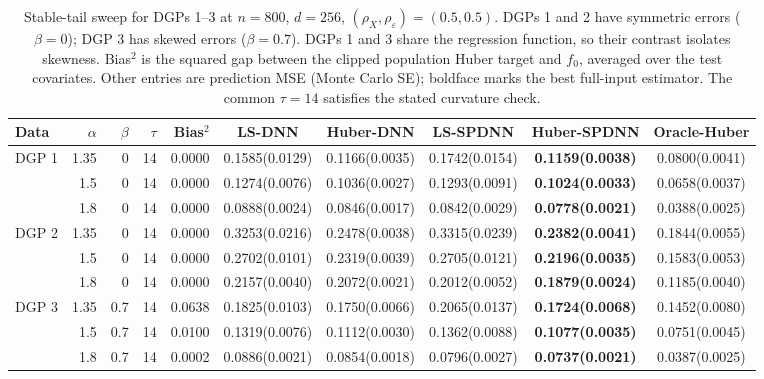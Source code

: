 \begin{table}[!ht]
\centering
\caption{Stable-tail sweep for DGPs 1--3 at $n=800$, $d=256$, $(\rho_X,\rho_\varepsilon)=(0.5,0.5)$. DGPs 1 and 2 have symmetric errors ($\beta=0$); DGP 3 has skewed errors ($\beta=0.7$). DGPs 1 and 3 share the regression function, so their contrast isolates skewness. Bias$^2$ is the squared gap between the clipped population Huber target and $f_0$, averaged over the test covariates. Other entries are prediction MSE (Monte Carlo SE); boldface marks the best full-input estimator. The common $\tau=14$ satisfies the stated curvature check.}
\label{tab:stable-tail-skew}
\begin{adjustbox}{max width=\linewidth}
\begin{tabular}{@{}lrrrrccccc@{}}
\toprule
Data & $\alpha$ & $\beta$ & $\tau$ & Bias$^2$ & LS-DNN & Huber-DNN & LS-SPDNN & Huber-SPDNN & Oracle-Huber\\
\midrule
\multirow{3}{*}{DGP 1} & 1.35 & 0 & 14 & 0.0000 & 0.1585(0.0129) & 0.1166(0.0035) & 0.1742(0.0154) & \textbf{0.1159(0.0038)} & 0.0800(0.0041)\\
 & 1.5 & 0 & 14 & 0.0000 & 0.1274(0.0076) & 0.1036(0.0027) & 0.1293(0.0091) & \textbf{0.1024(0.0033)} & 0.0658(0.0037)\\
 & 1.8 & 0 & 14 & 0.0000 & 0.0888(0.0024) & 0.0846(0.0017) & 0.0842(0.0029) & \textbf{0.0778(0.0021)} & 0.0388(0.0025)\\
\midrule
\multirow{3}{*}{DGP 2} & 1.35 & 0 & 14 & 0.0000 & 0.3253(0.0216) & 0.2478(0.0038) & 0.3315(0.0239) & \textbf{0.2382(0.0041)} & 0.1844(0.0055)\\
 & 1.5 & 0 & 14 & 0.0000 & 0.2702(0.0101) & 0.2319(0.0039) & 0.2705(0.0121) & \textbf{0.2196(0.0035)} & 0.1583(0.0053)\\
 & 1.8 & 0 & 14 & 0.0000 & 0.2157(0.0040) & 0.2072(0.0021) & 0.2012(0.0052) & \textbf{0.1879(0.0024)} & 0.1185(0.0040)\\
\midrule
\multirow{3}{*}{DGP 3} & 1.35 & 0.7 & 14 & 0.0638 & 0.1825(0.0103) & 0.1750(0.0066) & 0.2065(0.0137) & \textbf{0.1724(0.0068)} & 0.1452(0.0080)\\
 & 1.5 & 0.7 & 14 & 0.0100 & 0.1319(0.0076) & 0.1112(0.0030) & 0.1362(0.0088) & \textbf{0.1077(0.0035)} & 0.0751(0.0045)\\
 & 1.8 & 0.7 & 14 & 0.0002 & 0.0886(0.0021) & 0.0854(0.0018) & 0.0796(0.0027) & \textbf{0.0737(0.0021)} & 0.0387(0.0025)\\
\bottomrule
\end{tabular}
\end{adjustbox}
\end{table}
